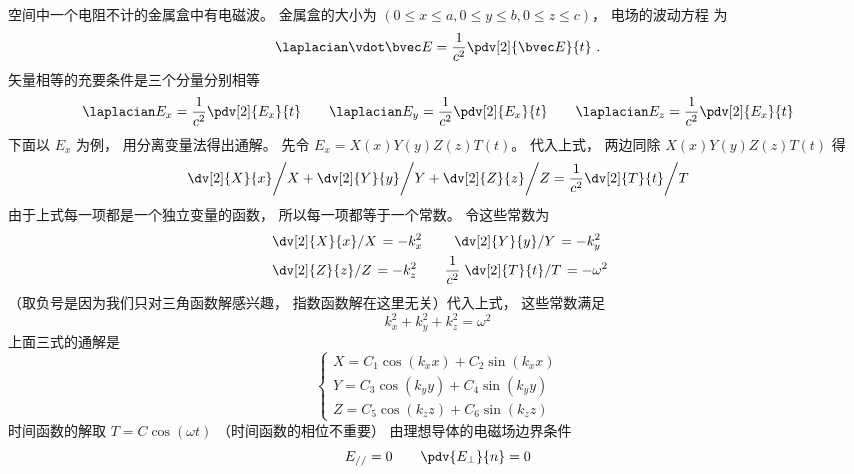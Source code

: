 

空间中一个电阻不计的金属盒中有电磁波。 金属盒的大小为 $(0 \leqslant x \leqslant a, 0 \leqslant y \leqslant b, 0 \leqslant z \leqslant c)$， 电场的波动方程%
为
\begin{equation}
\laplacian \vdot \bvec E = \frac{1}{c^2} \pdv[2]{\bvec E}{t}~.
\end{equation}  
矢量相等的充要条件是三个分量分别相等
\begin{equation}
\laplacian E_x = \frac{1}{c^2} \pdv[2]{E_x}{t} \qquad
\laplacian E_y = \frac{1}{c^2} \pdv[2]{E_x}{t} \qquad
\laplacian E_z = \frac{1}{c^2} \pdv[2]{E_x}{t}
\end{equation}   
下面以 $E_x$ 为例， 用分离变量法得出通解。
先令 $E_x = X(x) Y(y) Z(z) T(t)$。 代入上式， 两边同除 $X(x) Y(y) Z(z) T(t)$ 得
\begin{equation}
\left. \dv[2]{X}{x} \middle/ X + \dv[2]{Y}{y} \middle/ Y + \dv[2]{Z}{z} \middle/ Z  = \frac{1}{c^2}  \dv[2]{T}{t} \middle/ T\right.
\end{equation}
由于上式每一项都是一个独立变量的函数， 所以每一项都等于一个常数。 令这些常数为
\begin{equation}\begin{aligned}
&\left. \dv[2]{X}{x} \middle/ X \right. = -k_x^2 \qquad
\left. \dv[2]{Y}{y} \middle/ Y \right. = -k_y^2\\
&\left. \dv[2]{Z}{z} \middle/ Z \right. = -k_z^2 \qquad
\frac{1}{c^2} \left. \dv[2]{T}{t} \middle/ T \right. = -\omega^2
\end{aligned}\end{equation}
（取负号是因为我们只对三角函数解感兴趣， 指数函数解在这里无关）代入上式， 这些常数满足
\begin{equation}
k_x^2 + k_y^2 + k_z^2 = \omega ^2
\end{equation} 
上面三式的通解是
\begin{equation}
\begin{cases}
X = C_1\cos(k_x x) + C_2\sin(k_x x)\\
Y = C_3\cos(k_y y) + C_4\sin(k_y y)\\
Z = C_5\cos(k_z z) + C_6\sin(k_z z)
\end{cases}
\end{equation} 
时间函数的解取 $T = C\cos(\omega t)$ （时间函数的相位不重要）
由理想导体的电磁场边界条件%
\begin{equation}
E_{//} = 0  \qquad  \pdv{E_\bot}{n} = 0
\end{equation}  
